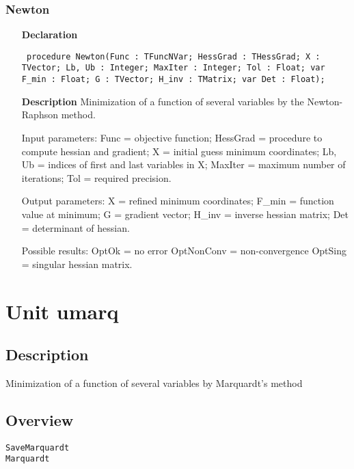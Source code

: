 \documentclass[12pt,a4paper,oneside]{report}
\newcommand{\declarationitem}[1]{\textbf{#1}}
\newcommand{\descriptiontitle}[1]{\textbf{#1}}
\newcommand{\code}[1]{\texttt{#1}}
\begin{document}
\subsubsection{Newton}
\label{unewton-Newton}
\begin{itemize}\item[\declarationitem{Declaration}\hfill]
	\begin{flushleft}
		\code{
			procedure Newton(Func : TFuncNVar; HessGrad : THessGrad; X : TVector; Lb, Ub : Integer; MaxIter : Integer; Tol : Float; var F{\_}min : Float; G : TVector; H{\_}inv : TMatrix; var Det : Float);}
		
	\end{flushleft}
	
	\par
	\item[\descriptiontitle{Description}]
	Minimization of a function of several variables by the Newton{-}Raphson method.
	
	Input parameters: Func = objective function; HessGrad = procedure to compute hessian and gradient; X = initial guess minimum coordinates; Lb, Ub = indices of first and last variables in X; MaxIter = maximum number of iterations; Tol = required precision.
	
	Output parameters: X = refined minimum coordinates; F{\_}min = function value at minimum; G = gradient vector; H{\_}inv = inverse hessian matrix; Det = determinant of hessian.
	
	Possible results: OptOk = no error OptNonConv = non{-}convergence OptSing = singular hessian matrix.
	
\end{itemize}
\section{Unit umarq}
\label{umarq}
\subsection{Description}
Minimization of a function of several variables by Marquardt's method 
\subsection{Overview}
\begin{description}
	\item[\texttt{SaveMarquardt}]
	\item[\texttt{Marquardt}]
\end{description}
\end{document}
